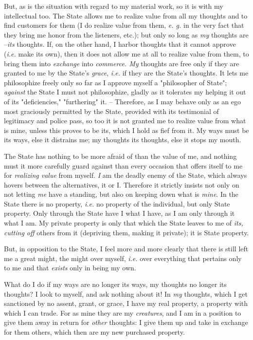 \documentclass[a4paper]{book}
\begin{document}
But, as is the situation with regard to my material work, so it is with my 
intellectual too. The State allows me to realize value from all my thoughts 
and to find customers for them (I do realize value from them, \textit{e. g.} 
in the very fact that they bring me honor from the listeners, etc.); but only 
so long as \textit{my} thoughts are --\textit{its} thoughts. If, on the other 
hand, I harbor thoughts that it cannot approve (\textit{i.e.} make its own), 
then it does not allow me at all to realize value from them, to bring them 
into \textit{exchange} into \textit{commerce. My} thoughts are free only if 
they are granted to me by the State's \textit{grace}, \textit{i.e.} if they 
are the State's thoughts. It lets me philosophize freely only so far as I 
approve myself a "{}philosopher of State"{}; \textit{against} the State I must 
not philosophize, gladly as it tolerates my helping it out of its 
"{}deficiencies,"{} "{}furthering"{} it. -- Therefore, as I may behave only as 
an ego most graciously permitted by the State, provided with its testimonial 
of legitimacy and police pass, so too it is not granted me to realize value 
from what is mine, unless this proves to be its, which I hold as fief from it. 
My ways must be its ways, else it distrains me; my thoughts its thoughts, else 
it stops my mouth.

The State has nothing to be more afraid of than the value of me, and nothing 
must it more carefully guard against than every occasion that offers itself to 
me for \textit{realizing value} from myself. \textit{I} am the deadly enemy of 
the State, which always hovers between the alternatives, it or I. Therefore it 
strictly insists not only on not letting \textit{me} have a standing, but also 
on keeping down what is \textit{mine}. In the State there is no property, 
\textit{i.e.} no property of the individual, but only State property. Only 
through the State have I what I have, as I am only through it what I am. My 
private property is only that which the State leaves to me of \textit{its, 
cutting off} others from it (depriving them, making it private); it is State 
property.

But, in opposition to the State, I feel more and more clearly that there is 
still left me a great might, the might over myself, \textit{i.e.} over 
everything that pertains only to me and that \textit{exists} only in being my 
own.

What do I do if my ways are no longer its ways, my thoughts no longer its 
thoughts? I look to myself, and ask nothing about it! In \textit{my} thoughts, 
which I get sanctioned by no assent, grant, or grace, I have my real property, 
a property with which I can trade. For as mine they are my \textit{creatures}, 
and I am in a position to give them away in return for \textit{other} 
thoughts: I give them up and take in exchange for them others, which then are 
my new purchased property.
\end{document}
